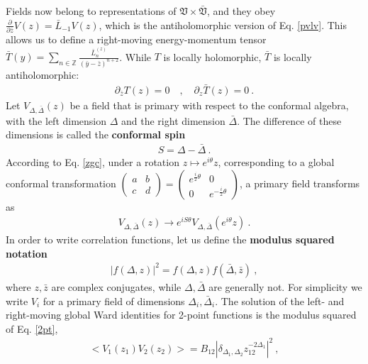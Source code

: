 \documentclass[12pt, a4paper]{article}
\newcommand{\myindex}[1]{\textbf{\boldmath #1}}
\theoremstyle{break}
\begin{document}
Fields now belong to representations of $\mathfrak{V}\times \bar{\mathfrak{V}}$, and they obey $\frac{\partial}{\partial \bar z} V(z) = \bar L_{-1} V(z)$, which is the antiholomorphic version of Eq. \eqref{pvlv}. This allows us to define a right-moving energy-momentum tensor $\bar T(y) = \sum_{n\in\mathbb{Z}} \frac{\bar L_n^{(z)}}{(\bar y-\bar z)^{n+2}}$. While $T$ is locally holomorphic, $\bar T$ is locally antiholomorphic:
\begin{align}
 \partial_{\bar z} T(z) = 0 \quad , \quad \partial_z \bar T(z) = 0 \ . 
\end{align}
Let $V_{\Delta,\bar\Delta}(z)$ be a field that is primary with respect to the conformal algebra, with the left dimension $\Delta$ and the right dimension $\bar\Delta$. The difference of these dimensions is called the \myindex{conformal spin}
\begin{align}
 S = \Delta -\bar\Delta\ . 
 \label{sdd} 
\end{align}
According to Eq. \eqref{zgc}, 
under a rotation $z\mapsto e^{i\theta}z$, corresponding to a global conformal transformation $\left(\begin{smallmatrix} a & b \\ c & d\end{smallmatrix}\right)= \left(\begin{smallmatrix} e^{\frac{i}{2}\theta} & 0 \\ 0 &  e^{-\frac{i}{2}\theta}\end{smallmatrix}\right)$, a primary field transforms as 
\begin{align}
 V_{\Delta,\bar\Delta}(z) \to  e^{iS\theta} V_{\Delta,\bar\Delta}\left(e^{i\theta} z\right) \ .
 \label{veis}
\end{align}
In order to write correlation functions, let us define the \myindex{modulus squared notation} 
\begin{align}
 \left| f(\Delta, z)\right|^2 = f(\Delta, z)f(\bar\Delta,\bar z)\ ,
 \label{fdz2}
\end{align}
where $z,\bar z$ are complex conjugates, while $\Delta,\bar\Delta$ are generally not. 
For simplicity we write $V_i$ for a primary field of dimensions $\Delta_i,\bar\Delta_i$.
The solution of the left- and right-moving global Ward identities for 2-point functions is the modulus squared of Eq. \eqref{2pt},
\begin{align}
\boxed{ \Big< V_1(z_1)V_2(z_2) \Big> = B_{12} \left|\delta_{\Delta_1,\Delta_2} z_{12}^{-2\Delta_1}\right|^2} \ ,
\label{2ptb}
\end{align}
\end{document}
